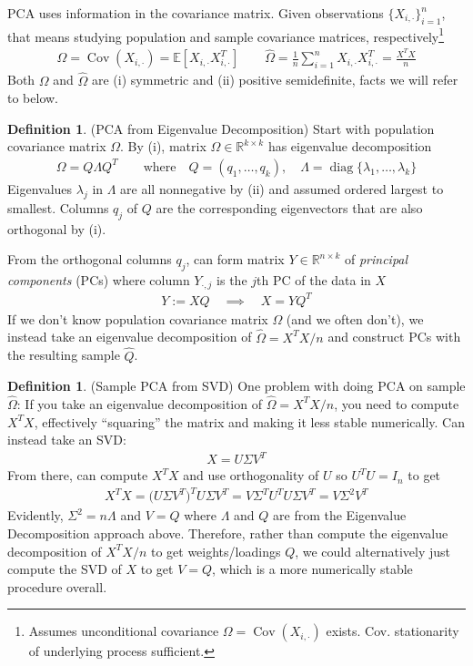 \documentclass[12pt]{book}
\numberwithin{equation}{section} %
\theoremstyle{plain}
\theoremstyle{definition}
\newtheorem{defn}[thm]{Definition}
\theoremstyle{remark}
\newcommand{\diag}{\operatorname{diag}}
\newcommand{\R}{\mathbb{R}}
\newcommand{\E}{\mathbb{E}}
\newcommand{\Cov}{\operatorname{Cov}}
\begin{document}
PCA uses information in the covariance matrix.  Given observations
$\{X_{i,\cdot}\}_{i=1}^n$, that means studying population and sample
covariance matrices, respectively\footnote{%
  Assumes unconditional covariance $\Omega=\Cov(X_{i,\cdot})$ exists.
  Cov. stationarity of underlying process sufficient.
}
\begin{align*}
  \Omega = \Cov(X_{i,\cdot})
  = \E[X_{i,\cdot}X_{i,\cdot}^T]
  \qquad
  \hat{\Omega}
  = \frac{1}{n}\sum_{i=1}^n X_{i,\cdot}X_{i,\cdot}^T
  = \frac{X^T X}{n}
\end{align*}
Both $\Omega$ and $\hat{\Omega}$ are (i) symmetric and (ii) positive
semidefinite, facts we will refer to below.

\begin{defn}(PCA from Eigenvalue Decomposition)
Start with population covariance matrix $\Omega$.  By (i), matrix
$\Omega\in\R^{k\times k}$ has eigenvalue decomposition
\begin{align*}
  \Omega = Q\Lambda Q^T
  \qquad\text{where}\quad
  Q=(q_1,\ldots,q_k),
  \quad \Lambda = \diag\{\lambda_1,\ldots,\lambda_k\}
\end{align*}
Eigenvalues $\lambda_j$ in $\Lambda$ are all nonnegative by (ii) and
assumed ordered largest to smallest.
Columns $q_j$ of $Q$ are the corresponding eigenvectors that are also
orthogonal by (i).

From the orthogonal columns $q_j$, can form matrix $Y\in\R^{n\times k}$
of \emph{principal components} (PCs) where column $Y_{\cdot,j}$ is the
$j$th PC of the data in $X$
\begin{align}
  Y := XQ
  \quad\implies\quad
  X = YQ^T
  \label{PCA}
\end{align}
If we don't know population covariance matrix $\Omega$ (and we often
don't), we instead take an eigenvalue decomposition of
$\hat{\Omega}=X^TX/n$ and construct PCs with the resulting sample
$\hat{Q}$.
\end{defn}


\begin{defn}(Sample PCA from SVD)
One problem with doing PCA on sample $\hat{\Omega}$:
If you take an eigenvalue decomposition of $\hat{\Omega}=X^TX/n$, you
need to compute $X^TX$, effectively ``squaring'' the matrix and making
it less stable numerically. Can instead take an SVD:
\begin{align*}
  X = U\Sigma V^T
\end{align*}
From there, can compute $X^TX$ and use orthogonality of $U$ so
$U^TU=I_n$ to get
\begin{align*}
  X^TX
  = \big(U\Sigma V^T\big)^TU\Sigma V^T
  = V\Sigma^T U^TU\Sigma V^T
  = V\Sigma^2 V^T
\end{align*}
Evidently, $\Sigma^2=n\Lambda$ and $V=Q$ where $\Lambda$ and $Q$ are
from the Eigenvalue Decomposition approach above. Therefore, rather than
compute the eigenvalue decomposition of $X^TX/n$ to get weights/loadings
$Q$, we could alternatively just compute the SVD of $X$ to get $V=Q$,
which is a more numerically stable procedure overall.
\end{defn}
\end{document}
